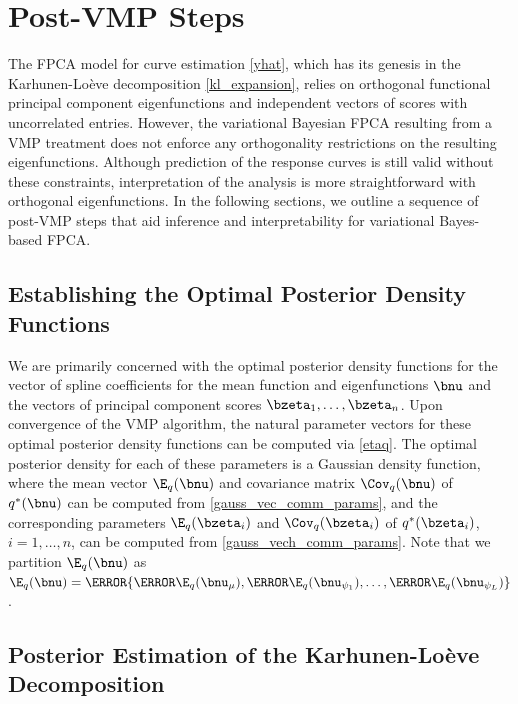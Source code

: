 \documentclass[ba]{imsart}
\numberwithin{equation}{section}
\theoremstyle{plain}
\def\numu{\bnu_\mu}
\newcommand\nupsi[1]{\bnu_{\psi_{#1}}}
\begin{document}

\section{Post-VMP Steps}
\label{sec:post_vmp_steps}

The FPCA model for curve estimation \eqref{yhat}, which has its genesis in the Karhunen-Lo\`{e}ve decomposition
\eqref{kl_expansion}, relies on orthogonal functional principal component
eigenfunctions and independent vectors of scores with uncorrelated entries.
However, the variational Bayesian FPCA resulting from a VMP treatment
does not enforce any orthogonality restrictions on the resulting eigenfunctions. Although prediction
of the response curves is still
valid without these constraints, interpretation of the analysis is more straightforward with orthogonal
eigenfunctions. In the following sections, we outline
a sequence of post-VMP steps that aid inference and interpretability for variational Bayes-based FPCA.


\subsection{Establishing the Optimal Posterior Density Functions}
\label{sec:opt_dens_funcs}

We are primarily concerned with the optimal posterior density functions for the vector of spline coefficients for
the mean function and eigenfunctions $\bnu$ and the vectors of principal component scores $\bzeta_1, \dots,
\bzeta_n$. Upon convergence of the VMP algorithm, the natural parameter vectors for these optimal posterior density
functions can be computed via \eqref{etaq}.
The optimal posterior density for each of these parameters is a Gaussian density
function, where the mean vector $\E_q (\bnu)$ and covariance matrix $\Cov_q (\bnu)$ of $q^* (\bnu)$
can be computed from
\eqref{gauss_vec_comm_params}, and the corresponding parameters $\E_q (\bzeta_i)$ and $\Cov_q (\bzeta_i)$
of $q^* (\bzeta_i)$, $i = 1, \dots, n$, can be
computed from \eqref{gauss_vech_comm_params}. Note that we partition $\E_q (\bnu)$ as $\E_q (\bnu) =
\T{\{ \T{\E_q (\numu)}, \T{\E_q (\nupsi{1})}, \dots, \T{\E_q (\nupsi{L})} \}}$.


\subsection{Posterior Estimation of the Karhunen-Lo\`{e}ve Decomposition}
\label{sec:biorthogonal}
\end{document}
